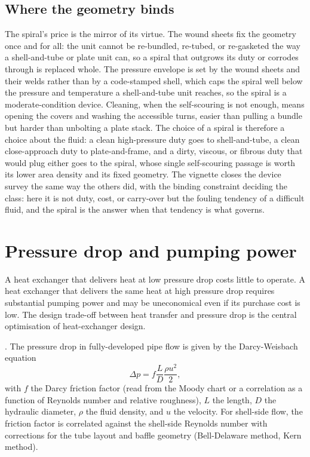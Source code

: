 \subsection{Where the geometry binds}

The spiral's price is the mirror of its virtue. The wound sheets fix the geometry once
and for all: the unit cannot be re-bundled, re-tubed, or re-gasketed the way a
shell-and-tube or plate unit can, so a spiral that outgrows its duty or corrodes
through is replaced whole. The pressure envelope is set by the wound sheets and their
welds rather than by a code-stamped shell, which caps the spiral well below the
pressure and temperature a shell-and-tube unit reaches, so the spiral is a
moderate-condition device. Cleaning, when the self-scouring is not enough, means
opening the covers and washing the accessible turns, easier than pulling a bundle but
harder than unbolting a plate stack. The choice of a spiral is therefore a choice
about the fluid: a clean high-pressure duty goes to shell-and-tube, a clean
close-approach duty to plate-and-frame, and a dirty, viscous, or fibrous duty that
would plug either goes to the spiral, whose single self-scouring passage is worth its
lower area density and its fixed geometry. The vignette closes the device survey the
same way the others did, with the binding constraint deciding the class: here it is not
duty, cost, or carry-over but the fouling tendency of a difficult fluid, and the
spiral is the answer when that tendency is what governs.

\section{Pressure drop and pumping power}

A heat exchanger that delivers heat at low pressure drop costs
little to operate. A heat exchanger that delivers the same heat at
high pressure drop requires substantial pumping power and may be
uneconomical even if its purchase cost is low. The design trade-off
between heat transfer and pressure drop is the central optimisation
of heat-exchanger design.

. The pressure drop in
fully-developed pipe flow is given by the Darcy-Weisbach equation
\[
\Delta p = f \frac{L}{D} \frac{\rho u^2}{2},
\]
with $f$ the Darcy friction factor (read from the Moody chart or a
correlation as a function of Reynolds number and relative roughness),
$L$ the length, $D$ the hydraulic diameter, $\rho$ the fluid density,
and $u$ the velocity. For shell-side flow, the friction factor is
correlated against the shell-side Reynolds number with corrections
for the tube layout and baffle geometry (Bell-Delaware method, Kern
method).

